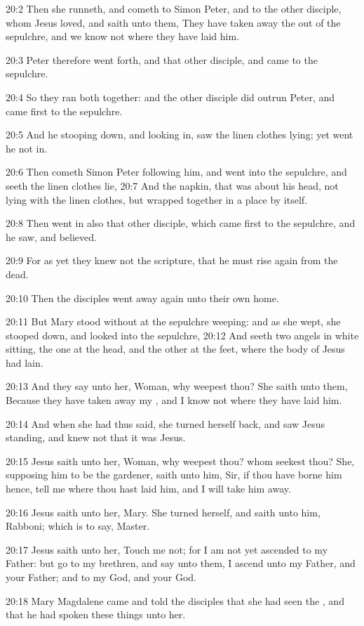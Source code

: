 20:2 Then she runneth, and cometh to Simon Peter, and to the other
disciple, whom Jesus loved, and saith unto them, They have taken away
the \LORD out of the sepulchre, and we know not where they have laid
him.

20:3 Peter therefore went forth, and that other disciple, and came to
the sepulchre.

20:4 So they ran both together: and the other disciple did outrun
Peter, and came first to the sepulchre.

20:5 And he stooping down, and looking in, saw the linen clothes
lying; yet went he not in.

20:6 Then cometh Simon Peter following him, and went into the
sepulchre, and seeth the linen clothes lie, 20:7 And the napkin, that
was about his head, not lying with the linen clothes, but wrapped
together in a place by itself.

20:8 Then went in also that other disciple, which came first to the
sepulchre, and he saw, and believed.

20:9 For as yet they knew not the scripture, that he must rise again
from the dead.

20:10 Then the disciples went away again unto their own home.

20:11 But Mary stood without at the sepulchre weeping: and as she
wept, she stooped down, and looked into the sepulchre, 20:12 And seeth
two angels in white sitting, the one at the head, and the other at the
feet, where the body of Jesus had lain.

20:13 And they say unto her, Woman, why weepest thou? She saith unto
them, Because they have taken away my \LORD, and I know not where they
have laid him.

20:14 And when she had thus said, she turned herself back, and saw
Jesus standing, and knew not that it was Jesus.

20:15 Jesus saith unto her, Woman, why weepest thou? whom seekest
thou?  She, supposing him to be the gardener, saith unto him, Sir, if
thou have borne him hence, tell me where thou hast laid him, and I
will take him away.

20:16 Jesus saith unto her, Mary. She turned herself, and saith unto
him, Rabboni; which is to say, Master.

20:17 Jesus saith unto her, Touch me not; for I am not yet ascended to
my Father: but go to my brethren, and say unto them, I ascend unto my
Father, and your Father; and to my God, and your God.

20:18 Mary Magdalene came and told the disciples that she had seen the
\LORD, and that he had spoken these things unto her.

